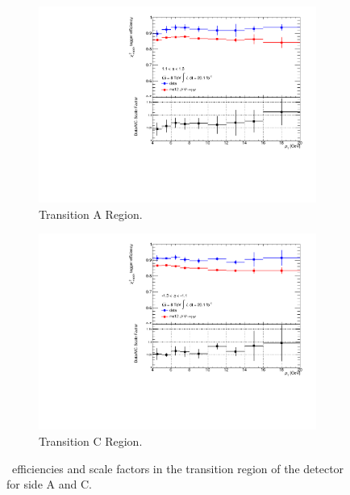\begin{figure}[htbp]
  \centering
  \begin{subfigure}[b]{0.85\textwidth}
    \includegraphics[width=\textwidth]{PartCalibration2012/Plots/SFPlots/Transition_A_smt.pdf}
    \caption{Transition A Region.} \label{fig:CalibrationScaleFactorTransitionA}
  \end{subfigure}
  
  \begin{subfigure}[b]{0.85\textwidth}
    \includegraphics[width=\textwidth]{PartCalibration2012/Plots/SFPlots/Transition_C_smt.pdf}
    \caption{Transition C Region.} \label{fig:CalibrationScaleFactorTransitionC}
  \end{subfigure}
  \caption[\xsm\ efficiencies and scale factors in the transition region of the detector for side A and C.]{\xsm\ efficiencies and scale factors in the transition region of the detector for side  A and  C.} \label{fig:CalibrationScaleFactorTransition}
\end{figure}

